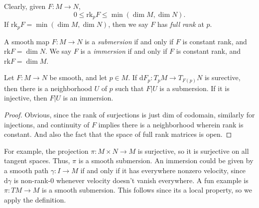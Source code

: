 Clearly, given $F : M \to N$,
\[
	0\leq \mathrm{rk}_pF \leq \min (\dim M,\dim N)
.\]
If $\mathrm{rk} _pF = \min (\dim M,\dim N)$, then we say $F$ has \emph{full rank} at $p$.

\begin{definition}\label{1.2.27}
	A smooth map $F : M \to N$ is a \emph{submersion} if and only if $F$ is constant rank, and $\mathrm{rk} F=\dim N$. We say $F$ is a \emph{immersion} if and only if $F$ is constant rank, and $\mathrm{rk} F = \dim M$.
\end{definition}


\begin{proposition}\label{1.2.28}
	Let $F : M \to N$ be smooth, and let $p\in M$. If $\mathrm{d} F_p : T_pM \to T_{F(p)} N$ is surective, then there is a neighborhood $U$ of $p$ such that $F|U$ is a submersion. If it is injective, then $F|U$ is an immersion.
\end{proposition}
\begin{proof}
	Obvious, since the rank of surjections is just dim of codomain, similarly for injections, and continuity of $F$ implies there is a neighborhood wherein rank is constant. And also the fact that the space of full rank matrices is open.
\end{proof}

For example, the projection $\pi :M\times N\to M$ is surjective, so it is surjective on all tangent spaces. Thus, $\pi $ is a smooth submersion. An immersion could be given by a smooth path $\gamma : I \to M$ if and only if it has everywhere nonzero velocity, since $\mathrm{d} \gamma $ is non-rank-0 whenever velocity doesn't vanish everywhere. A fun example is $\pi : TM \to M$ is a smooth submersion. This follows since its a local property, so we apply the definition.
